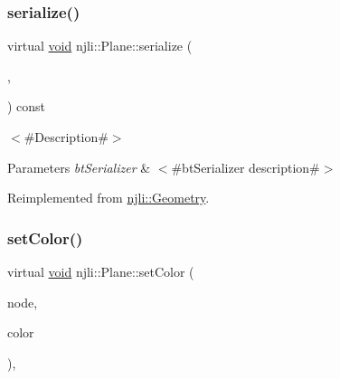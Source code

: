 \mbox{\label{classnjli_1_1_plane_a3a3dd9c8e6f4a7a8304732b80c1ce68f}} 
\subsubsection{\texorpdfstring{serialize()}{serialize()}}
{\footnotesize\ttfamily virtual \mbox{\hyperlink{_thread_8h_af1e856da2e658414cb2456cb6f7ebc66}{void}} njli\+::\+Plane\+::serialize (\begin{DoxyParamCaption}\item[{\mbox{\hyperlink{_thread_8h_af1e856da2e658414cb2456cb6f7ebc66}{void}} $\ast$}]{,  }\item[{bt\+Serializer $\ast$}]{ }\end{DoxyParamCaption}) const\hspace{0.3cm}{\ttfamily [virtual]}}

$<$\#\+Description\#$>$


\begin{DoxyParams}{Parameters}
{\em bt\+Serializer} & $<$\#bt\+Serializer description\#$>$ \\
\hline
\end{DoxyParams}


Reimplemented from \mbox{\hyperlink{classnjli_1_1_geometry_a42a35911278eb52e0013d6dadd80271d}{njli\+::\+Geometry}}.

\mbox{\label{classnjli_1_1_plane_a60396b5d7d0d1984cb05703a843cce79}} 
\subsubsection{\texorpdfstring{set\+Color()}{setColor()}}
{\footnotesize\ttfamily virtual \mbox{\hyperlink{_thread_8h_af1e856da2e658414cb2456cb6f7ebc66}{void}} njli\+::\+Plane\+::set\+Color (\begin{DoxyParamCaption}\item[{\mbox{\hyperlink{classnjli_1_1_node}{Node}} $\ast$}]{node,  }\item[{const bt\+Vector4 \&}]{color }\end{DoxyParamCaption})\hspace{0.3cm}{\ttfamily [protected]}, {\ttfamily [virtual]}}



